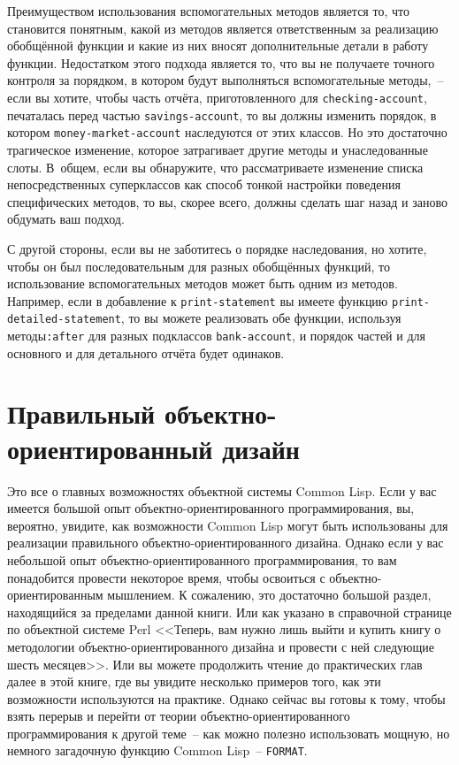 Преимуществом использования вспомогательных методов является то, что становится понятным,
какой из методов является ответственным за реализацию обобщённой функции и какие из них
вносят дополнительные детали в работу функции.  Недостатком этого подхода является то, что
вы не получаете точного контроля за порядком, в котором будут выполняться вспомогательные
методы,~-- если вы хотите, чтобы часть отчёта, приготовленного для \lstinline{checking-account},
печаталась перед частью \lstinline{savings-account}, то вы должны изменить порядок, в котором
\lstinline{money-market-account} наследуются от этих классов.  Но это достаточно трагическое
изменение, которое затрагивает другие методы и унаследованные слоты.  В~общем, если вы
обнаружите, что рассматриваете изменение списка непосредственных суперклассов как способ
тонкой настройки поведения специфических методов, то вы, скорее всего, должны сделать шаг
назад и заново обдумать ваш подход.

С другой стороны, если вы не заботитесь о порядке наследования, но хотите, чтобы он был
последовательным для разных обобщённых функций, то использование вспомогательных методов
может быть одним из методов.  Например, если в добавление к \lstinline{print-statement} вы
имеете функцию \lstinline{print-detailed-statement}, то вы можете реализовать обе функции,
используя методы\lstinline{:after} для разных подклассов \lstinline{bank-account}, и порядок частей
и для основного и для  детального отчёта будет одинаков.


\section{Правильный объектно-ориентированный дизайн}

Это все о главных возможностях объектной системы Common Lisp.  Если у вас имеется большой
опыт объектно-ориентированного программирования, вы, вероятно, увидите, как возможности
Common Lisp могут быть использованы для реализации правильного объектно-ориентированного
дизайна.  Однако если у вас небольшой опыт объектно-ориентированного программирования, то
вам понадобится провести некоторое время, чтобы освоиться с объектно-ориентированным
мышлением.  К сожалению, это достаточно большой раздел, находящийся за пределами данной
книги.  Или как указано в справочной странице по объектной системе Perl <<Теперь, вам
нужно лишь выйти и купить книгу о методологии объектно-ориентированного дизайна и
провести с ней следующие шесть месяцев>>.  Или вы можете продолжить чтение до практических
глав далее в этой книге, где вы увидите несколько примеров того, как эти возможности
используются на практике.  Однако сейчас вы готовы к тому, чтобы взять перерыв и перейти
от теории объектно-ориентированного программирования к другой теме~-- как можно полезно
использовать мощную, но немного загадочную функцию Common Lisp~-- \lstinline{FORMAT}.


